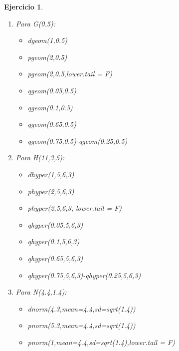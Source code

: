 \documentclass[11pt, a4paper]{article}
\newif\IfInSansMode
\theoremstyle{theorem-style}
\theoremstyle{definition-style}
\newtheorem{ejer}{Ejercicio}[section]
\theoremstyle{remark-style}
\theoremstyle{example-style}
\begin{document}
\begin{ejer}
\begin{enumerate}
\begin{itemize}
		\item qnbinom(0.65,4,0.3)
		
		\item qnbinom(0.75,4,0.3)-qnbinom(0.25,4,0.3)
	\end{itemize}
	\item Para G(0.5):
	\begin{itemize}
		\item dgeom(1,0.5)
		
		\item pgeom(2,0.5)
		
		\item pgeom(2,0.5,lower.tail = F)
		
		\item qgeom(0.05,0.5)
		
		\item qgeom(0.1,0.5)
		
		\item qgeom(0.65,0.5)
		
		\item qgeom(0.75,0.5)-qgeom(0.25,0.5)
	\end{itemize}
	\item Para H(11,3,5):
	\begin{itemize}
	
		\item dhyper(1,5,6,3)
	
		\item phyper(2,5,6,3)
	
		\item phyper(2,5,6,3, lower.tail = F)
	
		\item qhyper(0.05,5,6,3)
	
		\item qhyper(0.1,5,6,3)
	
		\item qhyper(0.65,5,6,3)
	
		\item qhyper(0.75,5,6,3)-qhyper(0.25,5,6,3) 
	\end{itemize}
	\item Para N(4.4,1.4):
	\begin{itemize}
		\item dnorm(4.3,mean=4.4,sd=sqrt(1.4))
		
		\item pnorm(5.3,mean=4.4,sd=sqrt(1.4))
		
		\item pnorm(1,mean=4.4,sd=sqrt(1.4),lower.tail = F)
		

\end{itemize}
\end{enumerate}
\end{ejer}
\end{document}
